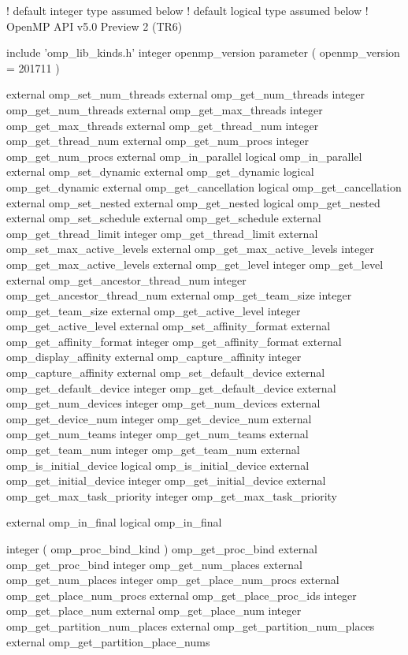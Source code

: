 {\small \begin{ompfSyntax}
! default integer type assumed below
! default logical type assumed below
! OpenMP API v5.0 Preview 2 (TR6)

     include 'omp_lib_kinds.h'
     integer openmp_version
     parameter ( openmp_version = 201711 )

     external omp_set_num_threads
     external omp_get_num_threads
     integer omp_get_num_threads
     external omp_get_max_threads
     integer omp_get_max_threads
     external omp_get_thread_num
     integer omp_get_thread_num
     external omp_get_num_procs
     integer omp_get_num_procs
     external omp_in_parallel
     logical omp_in_parallel
     external omp_set_dynamic
     external omp_get_dynamic
     logical omp_get_dynamic
     external omp_get_cancellation
     logical omp_get_cancellation
     external omp_set_nested
     external omp_get_nested
     logical omp_get_nested
     external omp_set_schedule
     external omp_get_schedule
     external omp_get_thread_limit
     integer omp_get_thread_limit
     external omp_set_max_active_levels
     external omp_get_max_active_levels
     integer omp_get_max_active_levels
     external omp_get_level
     integer omp_get_level
     external omp_get_ancestor_thread_num
     integer omp_get_ancestor_thread_num
     external omp_get_team_size
     integer omp_get_team_size
     external omp_get_active_level
     integer omp_get_active_level
     external omp_set_affinity_format
     external omp_get_affinity_format
     integer omp_get_affinity_format
     external omp_display_affinity
     external omp_capture_affinity
     integer omp_capture_affinity
     external omp_set_default_device
     external omp_get_default_device
     integer omp_get_default_device
     external omp_get_num_devices
     integer omp_get_num_devices
     external omp_get_device_num
     integer omp_get_device_num
     external omp_get_num_teams
     integer omp_get_num_teams
     external omp_get_team_num
     integer omp_get_team_num
     external omp_is_initial_device
     logical omp_is_initial_device
     external omp_get_initial_device
     integer omp_get_initial_device
     external omp_get_max_task_priority
     integer omp_get_max_task_priority

     external omp_in_final
     logical omp_in_final

     integer ( omp_proc_bind_kind ) omp_get_proc_bind
     external omp_get_proc_bind
     integer omp_get_num_places
     external omp_get_num_places
     integer omp_get_place_num_procs
     external omp_get_place_num_procs
     external omp_get_place_proc_ids
     integer omp_get_place_num
     external omp_get_place_num
     integer omp_get_partition_num_places
     external omp_get_partition_num_places
     external omp_get_partition_place_nums


\end{ompfSyntax}}
